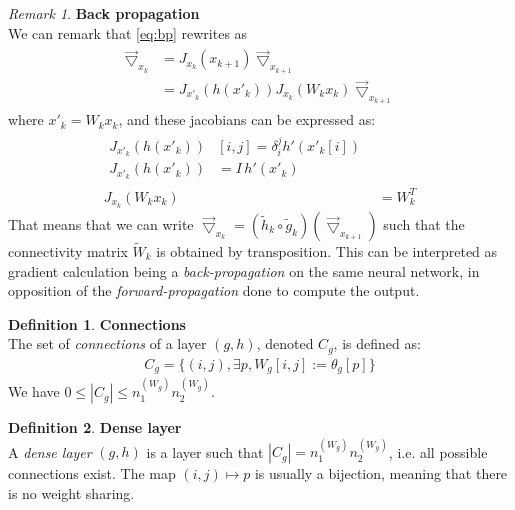 \documentclass{article}
\theoremstyle{definition}
\newtheorem{definition}{Definition}[section]
\theoremstyle{remark}
\newtheorem{remark}{Remark}
\theoremstyle{plain}
\newcommand{\ovec}{}
\begin{document}
\begin{remark}\textbf{Back propagation}\\

We can remark that \eqref{eq:bp} rewrites as
\begin{align}
  \begin{split}
  \vec{\bigtriangledown}_{x_k} & = J_{x_k}(\ovec{x_{k+1}}) \vec{\bigtriangledown}_{x_{k+1}} \\ 
                               & = J_{x'_k}(h(x'_k)) J_{x_k}(W_k x_k) \vec{\bigtriangledown}_{x_{k+1}}
  \end{split}
\end{align}
where $x'_k = W_k x_k$, and these jacobians can be expressed as:
\begin{align}
  \begin{split}
  J_{x'_k}(h(x'_k)) & [i,j] = \delta_i^j h'(x'_k[i])\\
  J_{x'_k}(h(x'_k)) & = I \hspace{2pt} h'(x'_k)
  \end{split}\\
  J_{x_k}(W_k x_k) & = W_k^T
\end{align}
That means that we can write $\vec{\bigtriangledown}_{x_k} = (\widetilde{h}_k \circ \widetilde{g}_k)(\vec{\bigtriangledown}_{x_{k+1}})$ such that the connectivity matrix $\widetilde{W}_k$ is obtained by transposition. This can be interpreted as gradient calculation being a \emph{back-propagation} on the same neural network, in opposition of the \emph{forward-propagation} done to compute the output.
\end{remark}

\begin{definition}\textbf{Connections}\\
The set of \emph{connections} of a layer $(g,h)$, denoted $C_g$, is defined as:
\begin{gather*}
  C_g = \{(i,j), \exists p, W_g[i,j] := \theta_g[p]\}
\end{gather*}
We have $0 \leq |C_g| \leq n_1^{(W_g)} n_2^{(W_g)}$.
\end{definition}

\begin{definition}\textbf{Dense layer}\\
A \textit{dense layer} $(g,h)$ is a layer such that $|C_g| = n_1^{(W_g)} n_2^{(W_g)}$, i.e. all possible connections exist. The map $(i,j) \mapsto p$ is usually a bijection, meaning that there is no weight sharing.
\end{definition}
\end{document}
